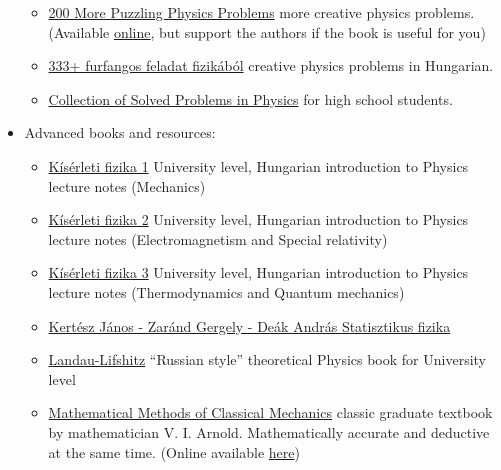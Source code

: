 \documentclass{article}
\begin{document}
\begin{itemize}
\begin{itemize}
    \item \href{https://www.cambridge.org/hu/academic/subjects/physics/general-and-classical-physics/200-more-puzzling-physics-problems-hints-and-solutions?format=HB&isbn=9781107103856}{200 More Puzzling Physics Problems} more creative physics problems. (Available \href{https://archive.org/details/200-more-puzzling-physics-problems-with-hints-and-solutions-gnv-64/}{online}, but support the authors if the book is useful for you)
    
    \item \href{https://www.typotex.hu/book/8924/gnadig_honyek_vigh_333___furfangos_feladat_fizikabol}{333+ furfangos feladat fizikából} creative physics problems in Hungarian.
    
    \item \href{http://physicstasks.eu/en}{Collection of Solved Problems in Physics} for high school students.
    
\end{itemize}

\item Advanced books and resources:
\begin{itemize}
    \item \href{https://mek.oszk.hu/14100/14198/14198.pdf}{Kísérleti fizika 1} University level, Hungarian introduction to Physics lecture notes (Mechanics)
    
    \item \href{http://physics.bme.hu/sites/physics.bme.hu/files/users/BMETE12AF46_kov/kisfiz2_jav.pdf}{Kísérleti fizika 2} University level, Hungarian introduction to Physics lecture notes (Electromagnetism and Special relativity)
    
    \item \href{http://physics.bme.hu/sites/physics.bme.hu/files/users/BMETE11AF46_kov/Jegyzet_UO.pdf}{Kísérleti fizika 3} University level, Hungarian  introduction to Physics lecture notes (Thermodynamics and Quantum mechanics)
    
    \item \href{https://mek.oszk.hu/14300/14398/}{Kertész János - Zaránd Gergely - Deák András
    Statisztikus fizika}
    
    \item \href{https://en.wikipedia.org/wiki/Course_of_Theoretical_Physics}{Landau-Lifshitz} ``Russian style'' theoretical Physics book for University level
    
    \item \href{https://www.springer.com/gp/book/9780387968902}{Mathematical Methods of Classical Mechanics} classic graduate textbook by mathematician V. I. Arnold. Mathematically accurate and deductive at the same time. (Online available \href{https://loshijosdelagrange.files.wordpress.com/2013/04/v-arnold-mathematical-methods-of-classical-mechanics-1989.pdf}{here})
    

\end{itemize}
\end{itemize}
\end{document}
